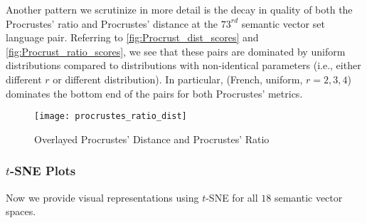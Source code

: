 \documentclass[12pt, usenames]{article}
\theoremstyle{definition}
\theoremstyle{definition}
\theoremstyle{definition}
\begin{document}
Another pattern we scrutinize in more detail is the decay in quality of both the Procrustes' ratio and Procrustes' distance at the $73^{rd}$ semantic vector set language pair. Referring to \autoref{fig:Procrust_dist_scores} and \autoref{fig:Procrust_ratio_scores}, we see that these pairs are dominated by uniform distributions compared to distributions with non-identical parameters (i.e., either different $r$ or different distribution). In particular, (French, uniform, $r = 2, 3, 4$) dominates the bottom end of the pairs for both Procrustes' metrics. 

\begin{figure}
\texttt{[image: procrustes\_ratio\_dist]}
\centering
\caption{Overlayed Procrustes' Distance and Procrustes' Ratio}
\label{fig:procrust_compare}
\end{figure}

\subsubsection{$t$-SNE Plots}

Now we provide visual representations using $t$-SNE for all $18$ semantic vector spaces.
\end{document}
